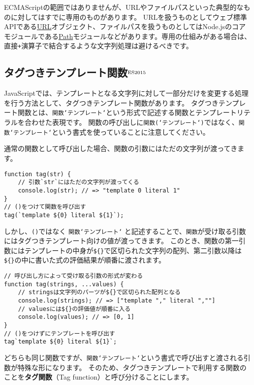 ECMAScriptの範囲ではありませんが、URLやファイルパスといった典型的なものに対してはすでに専用のものがあります。
URLを扱うものとしてウェブ標準APIである\href{https://developer.mozilla.org/ja/docs/Web/API/URL}{URL}オブジェクト、ファイルパスを扱うものとしてはNode.jsのコアモジュールである\href{https://nodejs.org/api/path.html}{Path}モジュールなどがあります。専用の仕組みがある場合は、直接\texttt{+}演算子で結合するような文字列処理は避けるべきです。

\hypertarget{tagged-template-function}{%
\subsection{タグつきテンプレート関数{$^{\rm ES2015}$}}\label{tagged-template-function}}

JavaScriptでは、テンプレートとなる文字列に対して一部分だけを変更する処理を行う方法として、タグつきテンプレート関数があります。
タグつきテンプレート関数とは、\texttt{関数`テンプレート`}という形式で記述する関数とテンプレートリテラルを合わせた表現です。
関数の呼び出しに\texttt{関数(`テンプレート`)}ではなく、\texttt{関数`テンプレート`}という書式を使っていることに注意してください。

通常の関数として呼び出した場合、関数の引数にはただの文字列が渡ってきます。

\begin{lstlisting}
function tag(str) {
    // 引数`str`にはただの文字列が渡ってくる
    console.log(str); // => "template 0 literal 1"
}
// ()をつけて関数を呼び出す
tag(`template ${0} literal ${1}`);
\end{lstlisting}

しかし、\texttt{()}ではなく
\texttt{関数`テンプレート`}
と記述することで、\texttt{関数}が受け取る引数にはタグつきテンプレート向けの値が渡ってきます。
このとき、関数の第一引数にはテンプレートの中身が\texttt{\$\{\}}で区切られた文字列の配列、第二引数以降は\texttt{\$\{\}}の中に書いた式の評価結果が順番に渡されます。

\begin{lstlisting}
// 呼び出し方によって受け取る引数の形式が変わる
function tag(strings, ...values) {
    // stringsは文字列のパーツが${}で区切られた配列となる
    console.log(strings); // => ["template "," literal ",""]
    // valuesには${}の評価値が順番に入る
    console.log(values); // => [0, 1]
}
// ()をつけずにテンプレートを呼び出す
tag`template ${0} literal ${1}`;
\end{lstlisting}

どちらも同じ関数ですが、\texttt{関数`テンプレート`}という書式で呼び出すと渡される引数が特殊な形になります。
そのため、タグつきテンプレートで利用する関数のことを\textbf{タグ関数}（Tag
function）と呼び分けることにします。

